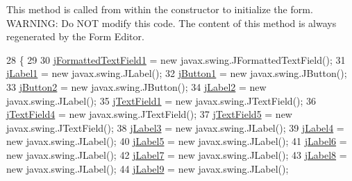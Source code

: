 This method is called from within the constructor to initialize the form. W\+A\+R\+N\+I\+NG\+: Do N\+OT modify this code. The content of this method is always regenerated by the Form Editor. 
\begin{DoxyCode}
28                                   \{
29 
30         \mbox{\hyperlink{classsoftware_1_1parasoftware3_a4e49828df449aa92bc2e485f901dc7ae}{jFormattedTextField1}} = \textcolor{keyword}{new} javax.swing.JFormattedTextField();
31         \mbox{\hyperlink{classsoftware_1_1parasoftware3_ae1871baf2f1bc751040bce3b2dc970c1}{jLabel1}} = \textcolor{keyword}{new} javax.swing.JLabel();
32         \mbox{\hyperlink{classsoftware_1_1parasoftware3_a64399e1ff0c22252784a8fb418269e32}{jButton1}} = \textcolor{keyword}{new} javax.swing.JButton();
33         \mbox{\hyperlink{classsoftware_1_1parasoftware3_aa69f792b77392d92a3821f9d35b0cf27}{jButton2}} = \textcolor{keyword}{new} javax.swing.JButton();
34         \mbox{\hyperlink{classsoftware_1_1parasoftware3_ada0c2e8fce30c1215e2a30042d386f00}{jLabel2}} = \textcolor{keyword}{new} javax.swing.JLabel();
35         \mbox{\hyperlink{classsoftware_1_1parasoftware3_a3415ad58f32ae42cfc88f7b498a2db38}{jTextField1}} = \textcolor{keyword}{new} javax.swing.JTextField();
36         \mbox{\hyperlink{classsoftware_1_1parasoftware3_a49b508e80d5a8bb6886b95f79fc5446e}{jTextField4}} = \textcolor{keyword}{new} javax.swing.JTextField();
37         \mbox{\hyperlink{classsoftware_1_1parasoftware3_acd863025f5ab774c7139623c6dab2f9b}{jTextField5}} = \textcolor{keyword}{new} javax.swing.JTextField();
38         \mbox{\hyperlink{classsoftware_1_1parasoftware3_a62ceb2511ec08ce64863778ec683c2ef}{jLabel3}} = \textcolor{keyword}{new} javax.swing.JLabel();
39         \mbox{\hyperlink{classsoftware_1_1parasoftware3_ae4d1716581a61676309b2c118472da31}{jLabel4}} = \textcolor{keyword}{new} javax.swing.JLabel();
40         \mbox{\hyperlink{classsoftware_1_1parasoftware3_ab53c1071f13a8fa9a2c371c4b9892253}{jLabel5}} = \textcolor{keyword}{new} javax.swing.JLabel();
41         \mbox{\hyperlink{classsoftware_1_1parasoftware3_a4afbf232c47d3ab6c0aaf0ae394219bf}{jLabel6}} = \textcolor{keyword}{new} javax.swing.JLabel();
42         \mbox{\hyperlink{classsoftware_1_1parasoftware3_a244f99c3af34ae7b3a9046d6efc18a95}{jLabel7}} = \textcolor{keyword}{new} javax.swing.JLabel();
43         \mbox{\hyperlink{classsoftware_1_1parasoftware3_aa6b9c08a2dd3c58649ccab6707950e45}{jLabel8}} = \textcolor{keyword}{new} javax.swing.JLabel();
44         \mbox{\hyperlink{classsoftware_1_1parasoftware3_ac84a161604551842c24b960457e78a4e}{jLabel9}} = \textcolor{keyword}{new} javax.swing.JLabel();

\end{DoxyCode}
